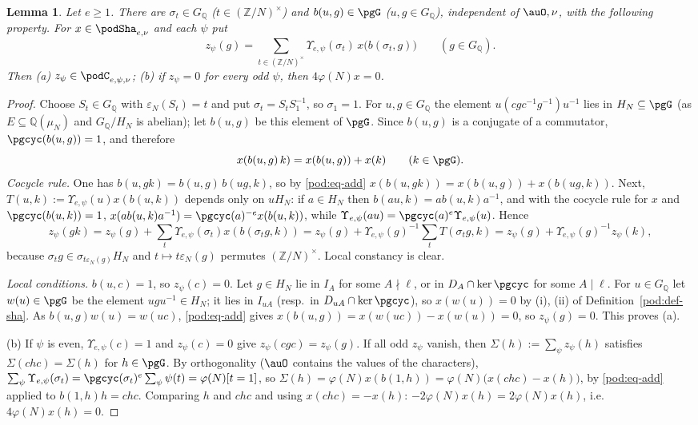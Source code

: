 \documentclass[10pt]{amsart}
\newtheorem{lemma}[theorem]{Lemma}
\theoremstyle{definition}
\theoremstyle{remark}
\newcommand{\Z}{\mathbb Z}
\newcommand{\Q}{\mathbb Q}
\begin{document}
\begin{lemma}\label{pod:split}
Let $e\ge1$. There are $\sigma_t\in G_\Q$ \textup($t\in(\Z/N)^\times$\textup) and $b(u,g)\in\pgG$
\textup($u,g\in G_\Q$\textup), independent of $\auO,\nu$, with the following property. For $x\in
\podSha_{e,\nu}$ and each $\psi$ put
\[
z_\psi(g)=\sum_{t\in(\Z/N)^\times}\Upsilon_{e,\psi}(\sigma_t)\,x\bigl(b(\sigma_t,g)\bigr)\qquad(g\in G_\Q).
\]
Then (a) $z_\psi\in\podC_{e,\psi,\nu}$; (b) if $z_\psi=0$ for every odd $\psi$, then $4\varphi(N)x=0$.
\end{lemma}
\begin{proof}
Choose $S_t\in G_\Q$ with $\varepsilon_N(S_t)=t$ and put $\sigma_t=S_tS_1^{-1}$, so $\sigma_1=1$. For
$u,g\in G_\Q$ the element $u(cgc^{-1}g^{-1})u^{-1}$ lies in $H_N\subseteq\pgG$ (as $E\subseteq
\Q(\mu_N)$ and $G_\Q/H_N$ is abelian); let $b(u,g)$ be this element of $\pgG$. Since $b(u,g)$ is a conjugate of a commutator,
$\pgcyc(b(u,g))=1$, and therefore
\begin{equation}\label{pod:eq-add}
x(b(u,g)\,k)=x(b(u,g))+x(k)\qquad(k\in\pgG).
\end{equation}
\emph{Cocycle rule.} One has $b(u,gk)=b(u,g)\,b(ug,k)$, so by \eqref{pod:eq-add}
$x(b(u,gk))=x(b(u,g))+x(b(ug,k))$. Next, $T(u,k):=\Upsilon_{e,\psi}(u)x(b(u,k))$ depends only on
$uH_N$: if $a\in H_N$ then $b(au,k)=ab(u,k)a^{-1}$, and with the cocycle rule for $x$ and
$\pgcyc(b(u,k))=1$, $x(ab(u,k)a^{-1})=\pgcyc(a)^{-e}x(b(u,k))$, while $\Upsilon_{e,\psi}(au)=
\pgcyc(a)^e\Upsilon_{e,\psi}(u)$. Hence
\[
z_\psi(gk)=z_\psi(g)+\sum_t\Upsilon_{e,\psi}(\sigma_t)x(b(\sigma_tg,k))
=z_\psi(g)+\Upsilon_{e,\psi}(g)^{-1}\sum_tT(\sigma_tg,k)=z_\psi(g)+\Upsilon_{e,\psi}(g)^{-1}z_\psi(k),
\]
because $\sigma_tg\in\sigma_{t\varepsilon_N(g)}H_N$ and $t\mapsto t\varepsilon_N(g)$ permutes
$(\Z/N)^\times$. Local constancy is clear.

\emph{Local conditions.} $b(u,c)=1$, so $z_\psi(c)=0$. Let $g\in H_N$ lie in $I_A$ for some $A\nmid
\ell$, or in $D_A\cap\ker\pgcyc$ for some $A\mid\ell$. For $u\in G_\Q$ let $w(u)\in\pgG$ be the
element $ugu^{-1}\in H_N$; it lies in $I_{uA}$ (resp.\ in $D_{uA}\cap\ker\pgcyc$), so $x(w(u))=0$ by
(i), (ii) of Definition~\ref{pod:def-sha}. As $b(u,g)w(u)=w(uc)$, \eqref{pod:eq-add} gives
$x(b(u,g))=x(w(uc))-x(w(u))=0$, so $z_\psi(g)=0$. This proves (a).

(b) If $\psi$ is even, $\Upsilon_{e,\psi}(c)=1$ and $z_\psi(c)=0$ give $z_\psi(cgc)=z_\psi(g)$. If all
odd $z_\psi$ vanish, then $\Sigma(h):=\sum_\psi z_\psi(h)$ satisfies $\Sigma(chc)=\Sigma(h)$ for
$h\in\pgG$. By orthogonality ($\auO$ contains the values of the characters),
$\sum_\psi\Upsilon_{e,\psi}(\sigma_t)=\pgcyc(\sigma_t)^e\sum_\psi\psi(t)=\varphi(N)[t=1]$, so
$\Sigma(h)=\varphi(N)x(b(1,h))=\varphi(N)\bigl(x(chc)-x(h)\bigr)$, by \eqref{pod:eq-add} applied to
$b(1,h)h=chc$. Comparing $h$ and $chc$ and using $x(chc)=-x(h)$:
$-2\varphi(N)x(h)=2\varphi(N)x(h)$, i.e.\ $4\varphi(N)x(h)=0$.
\end{proof}
\end{document}
